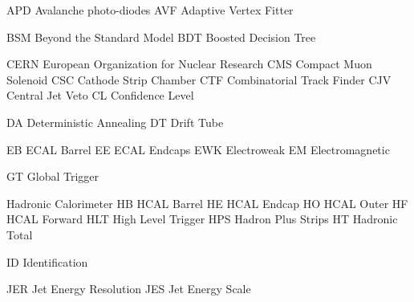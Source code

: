 
  {APD}  {Avalanche photo-diodes}
  {AVF}  {Adaptive Vertex Fitter}

 {BSM} {Beyond the Standard Model}
 {BDT} {Boosted Decision Tree}

 {CERN} {European Organization for Nuclear Research} %
  {CMS}  {Compact Muon Solenoid}
  {CSC}  {Cathode Strip Chamber}
  {CTF}  {Combinatorial Track Finder}
  {CJV}  {Central Jet Veto}
   {CL}   {Confidence Level}

 {DA} {Deterministic Annealing}
 {DT} {Drift Tube}

  {EB}  {ECAL Barrel}
  {EE}  {ECAL Endcaps}
 {EWK} {Electroweak}
  {EM}  {Electromagnetic}


 {GT} {Global Trigger}

  {Hadronic Calorimeter}
  {HB}    {HCAL Barrel}
  {HE}    {HCAL Endcap}
  {HO}    {HCAL Outer}
  {HF}    {HCAL Forward}
 {HLT}   {High Level Trigger}
 {HPS}   {Hadron Plus Strips}
  {HT}    {Hadronic Total}

 {ID} {Identification}

 {JER} {Jet Energy Resolution}
 {JES} {Jet Energy Scale}

